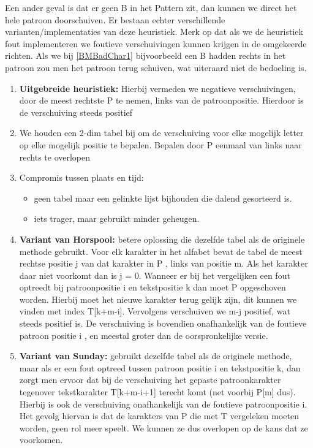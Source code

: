Een ander geval is dat er geen B in het Pattern zit, dan kunnen we direct het hele patroon doorschuiven.
\clearpage
Er bestaan echter verschillende varianten/implementaties van deze heuristiek. Merk op dat als we de heuristiek fout implementeren we foutieve verschuivingen kunnen krijgen in de omgekeerde richten. Als we bij \ref{BMBadChar1} bijvoorbeeld een B hadden rechts in het patroon zou men het patroon terug schuiven, wat uiteraard niet de bedoeling is.
\begin{enumerate}
\item \textbf{Uitgebreide heuristiek:} Hierbij vermeden we negatieve verschuivingen, door de meest rechtste P te nemen, links van de patroonpositie. Hierdoor is de verschuiving steeds positief
\item We houden een 2-dim tabel bij om de verschuiving voor elke mogelijk letter op elke mogelijk positie te bepalen. Bepalen door P eenmaal van links naar rechts te overlopen
\item Compromis tussen plaats en tijd:
\begin{itemize}
\item geen tabel maar een gelinkte lijst bijhouden die dalend gesorteerd is.
\item iets trager, maar gebruikt minder geheugen.
\end{itemize}

\item \textbf{Variant van Horspool:} betere oplossing die dezelfde tabel als de originele methode gebruikt. Voor elk karakter in het alfabet bevat de tabel de meest rechtse positie j van dat karakter in P , links van positie m. Als het karakter daar niet voorkomt dan is j = 0. Wanneer er bij het vergelijken een fout optreedt bij patroonpositie i en tekstpositie k dan moet P opgeschoven worden. Hierbij moet het nieuwe karakter terug gelijk zijn, dit kunnen we vinden met index T[k+m-i]. Vervolgens verschuiven we m-j positief, wat steeds positief is.
\npar
De verschuiving is bovendien onafhankelijk van de foutieve patroon positie i , en meestal groter dan de oorspronkelijke versie.

\item \textbf{Variant van Sunday:} gebruikt dezelfde tabel als de originele methode, maar als er een fout optreed tussen patroon positie i en tekstpositie k, dan zorgt men ervoor dat bij de verschuiving het gepaste patroonkarakter tegenover tekstkarakter T[k+m-i+1] terecht komt (net voorbij P[m] dus).
\npar
Hierbij is ook de verschuiving onafhankelijk van de foutieve patroonpositie i. Het gevolg hiervan is dat de karakters van P die met T vergeleken moeten worden, geen rol meer speelt. We kunnen ze dus overlopen op de kans dat ze voorkomen.
\end{enumerate}
\clearpage
